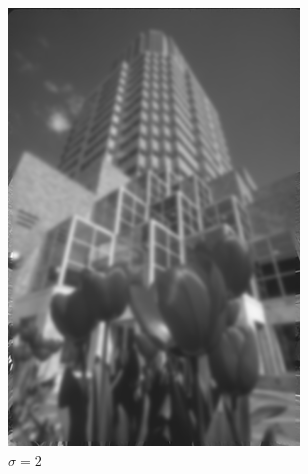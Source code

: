 \documentclass{article}
\begin{document}
\begin{figure}[!h]
\begin{subfigure}[b]{0.3\textwidth}
    \includegraphics[width=0.85\textwidth]{redsig2}
    \caption{$\sigma = 2$}
    \label{fig:f2}
  \end{subfigure}
   \hfill
  \begin{subfigure}[b]{0.3\textwidth}
    \centering

\end{subfigure}
\end{figure}
\end{document}
